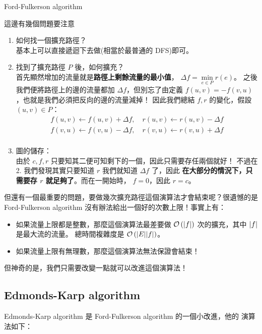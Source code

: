 \documentclass[a4paper,12pt]{book}
\begin{document}
\begin{algorithm}[H]
  \DontPrintSemicolon
  \caption{Ford-Fulkerson algorithm}\label{euclid}
  \myalg{\FF{}} {
}
\end{algorithm}
這邊有幾個問題要注意
\begin{enumerate}
  \item 如何找一個擴充路徑？\\
    基本上可以直接遞迴下去做(相當於最普通的 DFS)即可。
  \item 找到了擴充路徑 $P$ 後，如何擴充？\\
    首先顯然增加的流量就是{\bf 路徑上剩餘流量的最小值}， 
    $\Delta f = \min\limits_{e \in P} r(e)$。
    之後我們便將路徑上的邊的流量都加 $\Delta f$，但別忘了由定義
    $f(u, v) = -f(v, u)$，也就是我們必須把反向的邊的流量減掉！
    因此我們總結 $f, r$ 的變化，假設 $(u, v) \in P$：
    \begin{align*}
    f(u, v) \gets f(u, v) + \Delta f, \quad r(u, v) \gets r(u, v) - \Delta f \\
    f(v, u) \gets f(v, u) - \Delta f, \quad r(v, u) \gets r(v, u) + \Delta f \\
    \end{align*}
  \item 圖的儲存：\\
    由於 $c, f, r$ 只要知其二便可知剩下的一個，因此只需要存任兩個就好！
    不過在 2. 我們發現其實只要知道 $r$ 我們就知道 $\Delta f$ 了，因此
    {\bf 在大部分的情況下，只需要存 $r$ 就足夠了}。而在一開始時，
    $f = 0$，因此 $r = c$。
\end{enumerate}
但還有一個最重要的問題，要做幾次擴充路徑這個演算法才會結束呢？很遺憾的是
Ford-Fulkerson algorithm 沒有辦法給出一個好的次數上限！事實上有：
\begin{itemize}
  \item 如果流量上限都是整數，那麼這個演算法最差要做 
    $\operatorname{\mathcal{O}}\left(\lvert f \rvert\right)$ 次的擴充，其中 $\lvert f \rvert$ 是最大流的流量。
    總時間複雜度是 $\operatorname{\mathcal{O}}\left(\lvert E \rvert\lvert f \rvert\right)$。
  \item 如果流量上限有無理數，那麼這個演算法無法保證會結束！
\end{itemize}
但神奇的是，我們只需要改變一點就可以改進這個演算法！
\subsection{Edmonds-Karp algorithm}
Edmonds-Karp algorithm 是 Ford-Fulkerson algorithm 的一個小改進，他的
演算法如下：
\end{document}
